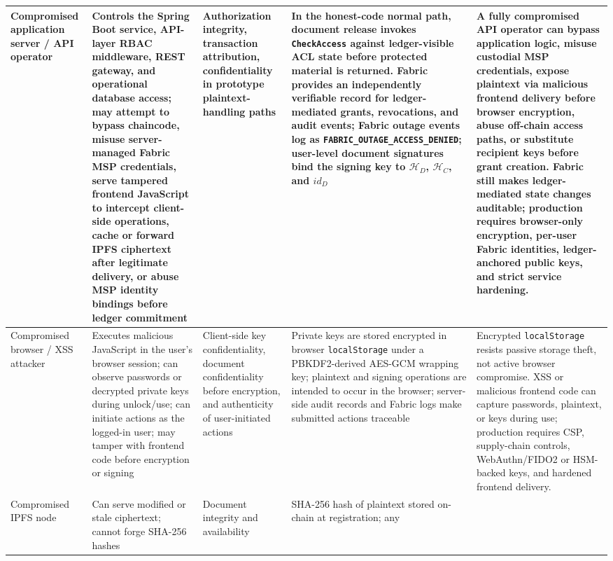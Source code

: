 \documentclass{ieeeaccess}
\begin{document}
\begin{table}[!t]
\begin{tabularx}{\textwidth}{|p{2.2cm}|X|p{2.0cm}|X|X|}
\hline
Compromised application server / API operator &
Controls the Spring Boot service, API-layer RBAC middleware, REST gateway, and operational database access; may attempt to bypass chaincode, misuse
server-managed Fabric MSP credentials, serve tampered frontend
JavaScript to intercept client-side operations, cache or forward IPFS
ciphertext after legitimate delivery, or abuse MSP identity bindings
before ledger commitment &
Authorization integrity, transaction attribution, confidentiality in
prototype plaintext-handling paths &
In the honest-code normal path, document release invokes
\texttt{CheckAccess} against ledger-visible ACL state before protected
material is returned. Fabric provides an independently verifiable
record for ledger-mediated grants, revocations, and audit events; Fabric outage events log as \texttt{FABRIC\_OUTAGE\_ACCESS\_DENIED}; user-level
document signatures bind the signing key to $\mathcal{H}_D$, $\mathcal{H}_C$, and $id_D$ &
A fully compromised API operator can bypass application logic, misuse
custodial MSP credentials, expose plaintext via malicious frontend
delivery before browser encryption, abuse off-chain access paths, or
substitute recipient keys before grant creation. Fabric still makes
ledger-mediated state changes auditable; production requires
browser-only encryption, per-user Fabric identities, ledger-anchored
public keys, and strict service hardening. \\
\hline
Compromised browser / XSS attacker &
Executes malicious JavaScript in the user's browser session; can
observe passwords or decrypted private keys during unlock/use; can
initiate actions as the logged-in user; may tamper with frontend code
before encryption or signing &
Client-side key confidentiality, document confidentiality before
encryption, and authenticity of user-initiated actions &
Private keys are stored encrypted in browser \texttt{localStorage}
under a PBKDF2-derived AES-GCM wrapping key; plaintext and signing
operations are intended to occur in the browser; server-side audit
records and Fabric logs make submitted actions traceable &
Encrypted \texttt{localStorage} resists passive storage theft, not
active browser compromise. XSS or malicious frontend code can capture
passwords, plaintext, or keys during use; production requires CSP,
supply-chain controls, WebAuthn/FIDO2 or HSM-backed keys, and hardened
frontend delivery. \\
\hline
Compromised IPFS node &
Can serve modified or stale ciphertext; cannot forge SHA-256 hashes &
Document integrity and availability &
SHA-256 hash of plaintext stored on-chain at registration; any

\end{tabularx}
\end{table}
\end{document}
